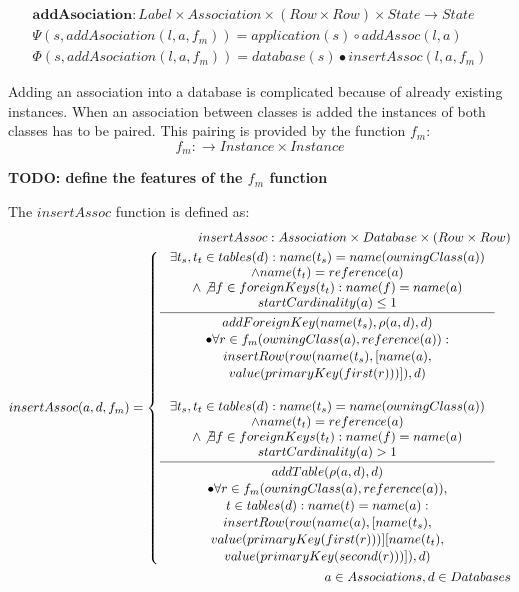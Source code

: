 \documentclass[11pt]{article}
\begin{document}
\begin{align*}
\mathbf{addAsociation} : Label \times Association \times (Row \times Row) \times State \rightarrow State \\
\Psi(s, addAsociation(l, a, f_m)) = application(s) \circ addAssoc(l, a) \\
\Phi(s, addAsociation(l, a, f_m)) = database(s) \bullet insertAssoc(l, a, f_m)
\end{align*}

Adding an association into a database is complicated because of already existing instances. When an association between classes is added the instances of both classes has to be paired. This pairing is provided by the function $f_m$:
$$f_m : \rightarrow Instance \times Instance $$

\textbf{TODO: define the features of the $f_m$ function}

The $insertAssoc$ function is defined as:
\begin{align*}
insertAssoc : Association \times Database \times (Row \times Row) \\
insertAssoc(a, d, f_m) = \begin{cases}
\inference{ \exists t_s, t_t \in tables(d) : name(t_s) = name(owningClass(a)) \\ \wedge name(t_t) = reference(a) \\ \wedge \not \exists f \in foreignKeys(t_t) : name(f) = name(a) \\ startCardinality(a) \leq 1}{\begin{gathered}
addForeignKey(name(t_s), \rho(a,d), d) \\ \bullet \forall r \in f_m(owningClass(a), reference(a)) : \\ insertRow(row(name(t_s), [name(a), \\ value(primaryKey(first(r)))]), d)
\end{gathered}
 }
 \\ \\
\inference{ \exists t_s, t_t \in tables(d) : name(t_s) = name(owningClass(a)) \\ \wedge name(t_t) = reference(a) \\ \wedge \not \exists f \in foreignKeys(t_t) : name(f) = name(a) \\ startCardinality(a) > 1}{\begin{gathered} addTable(\rho(a,d),d) \\ \bullet \forall r \in f_m(owningClass(a), reference(a)),\\ t \in tables(d) : name(t) = name(a) : \\ insertRow(row(name(a), [name(t_s), \\ value(primaryKey(first(r)))] [name(t_t), \\ value(primaryKey(second(r)))]), d)
\end{gathered}
 } 
 \end{cases}\\
 a \in Associations, d \in Databases
\end{align*}
\end{document}
